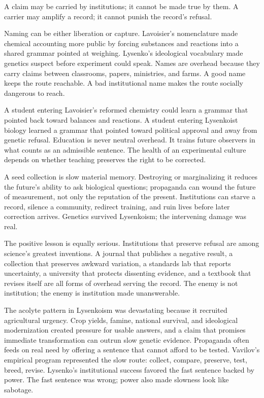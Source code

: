 A claim may be carried by institutions; it cannot be made true by them.
A carrier may amplify a record; it cannot punish the record's refusal.

Naming can be either liberation or capture. Lavoisier's nomenclature
made chemical accounting more public by forcing substances and reactions
into a shared grammar pointed at weighing. Lysenko's ideological
vocabulary made genetics suspect before experiment could speak. Names
are overhead because they carry claims between classrooms, papers,
ministries, and farms. A good name keeps the route reachable. A bad
institutional name makes the route socially dangerous to reach.

A student entering Lavoisier's reformed chemistry could learn a grammar
that pointed back toward balances and reactions. A student entering
Lysenkoist biology learned a grammar that pointed toward political
approval and away from genetic refusal. Education is never neutral
overhead. It trains future observers in what counts as an admissible
sentence. The health of an experimental culture depends on whether
teaching preserves the right to be corrected.

A seed collection is slow material memory. Destroying or marginalizing
it reduces the future's ability to ask biological questions; propaganda
can wound the future of measurement, not only the reputation of the
present. Institutions can starve a record, silence a community, redirect
training, and ruin lives before later correction arrives. Genetics
survived Lysenkoism; the intervening damage was real.

The positive lesson is equally serious. Institutions that preserve
refusal are among science's greatest inventions. A journal that
publishes a negative result, a collection that preserves awkward
variation, a standards lab that reports uncertainty, a university that
protects dissenting evidence, and a textbook that revises itself are
all forms of overhead serving the record. The enemy is not institution;
the enemy is institution made unanswerable.

The acolyte pattern in Lysenkoism was devastating because it recruited
agricultural urgency. Crop yields, famine, national survival, and
ideological modernization created pressure for usable answers, and a
claim that promises immediate transformation can outrun slow genetic
evidence. Propaganda often feeds on real need by offering a sentence
that cannot afford to be tested. Vavilov's empirical program represented
the slow route: collect, compare, preserve, test, breed, revise.
Lysenko's institutional success favored the fast sentence backed by
power. The fast sentence was wrong; power also made slowness look like
sabotage.

